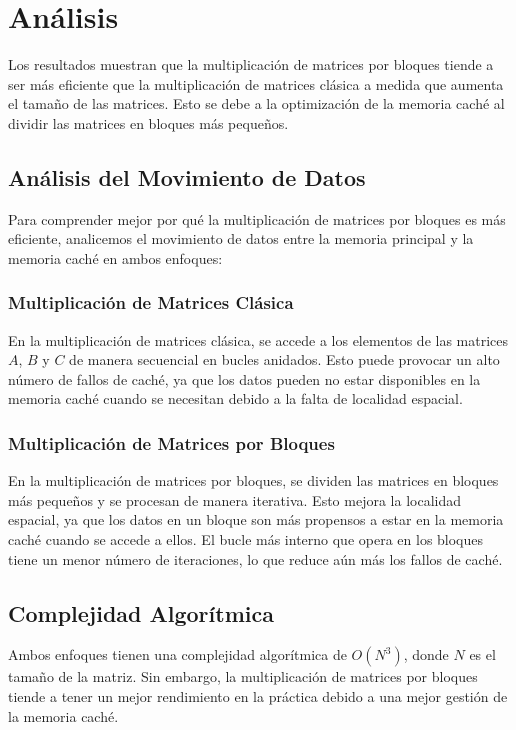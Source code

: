 \section{Análisis}
Los resultados muestran que la multiplicación de matrices por bloques tiende a ser más eficiente que la multiplicación de matrices clásica a medida que aumenta el tamaño de las matrices. Esto se debe a la optimización de la memoria caché al dividir las matrices en bloques más pequeños.

\subsection{Análisis del Movimiento de Datos}
Para comprender mejor por qué la multiplicación de matrices por bloques es más eficiente, analicemos el movimiento de datos entre la memoria principal y la memoria caché en ambos enfoques:

\subsubsection{Multiplicación de Matrices Clásica}
En la multiplicación de matrices clásica, se accede a los elementos de las matrices $A$, $B$ y $C$ de manera secuencial en bucles anidados. Esto puede provocar un alto número de fallos de caché, ya que los datos pueden no estar disponibles en la memoria caché cuando se necesitan debido a la falta de localidad espacial.

\subsubsection{Multiplicación de Matrices por Bloques}
En la multiplicación de matrices por bloques, se dividen las matrices en bloques más pequeños y se procesan de manera iterativa. Esto mejora la localidad espacial, ya que los datos en un bloque son más propensos a estar en la memoria caché cuando se accede a ellos. El bucle más interno que opera en los bloques tiene un menor número de iteraciones, lo que reduce aún más los fallos de caché.

\subsection{Complejidad Algorítmica}
Ambos enfoques tienen una complejidad algorítmica de $O(N^3)$, donde $N$ es el tamaño de la matriz. Sin embargo, la multiplicación de matrices por bloques tiende a tener un mejor rendimiento en la práctica debido a una mejor gestión de la memoria caché.

